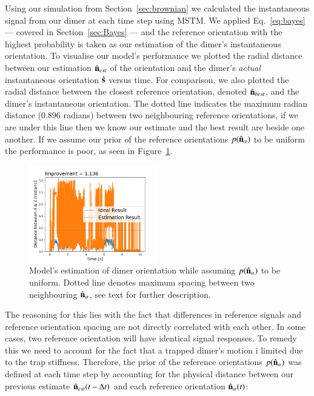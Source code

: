 \documentclass[final, 3p]{elsarticle}
\begin{document}
Using our simulation from Section~\ref{sec:brownian} we calculated the instantaneous signal from our dimer at each time step using MSTM.  We applied Eq.~\eqref{eq:bayes} --- covered in Section~\ref{sec:Bayes} --- and the reference orientation with the highest probability is taken as our estimation of the dimer's instantaneous orientation. To visualise our model's performance  we plotted the radial distance between our estimation $\hat{\bf n}_{est}$ of the orientation and the dimer's \emph{actual} instantaneous orientation $\hat{\bf s}$ versus time. For comparison, we also plotted the radial distance between the closest reference orientation, denoted $\hat{\bf n}_{best}$, and the dimer's instantaneous orientation. The dotted line indicates the maximum radian distance ($0.896$ radians) between two neighbouring reference orientations, if we are under this line then we know our estimate and the best result are beside one another. If we assume our prior of the reference orientations $p(\hat{\bf n}_\alpha)$ to be uniform the performance is poor, as seen in Figure~\ref{fig:uniform}.

\begin{figure}[h]
	\centering
	\includegraphics[width=0.5\textwidth]{./Images/fig3.png}
	\caption{Model's estimation of dimer orientation while assuming $p(\hat{\bf n}_\alpha)$ to be uniform. Dotted line denotes maximum spacing between two neighbouring $\hat{\bf n}_\alpha$, see text for further description.}
	\label{fig:uniform}
\end{figure} 

The reasoning for this lies with the fact that differences in reference signals and reference orientation spacing are not directly correlated with each other. In some cases, two reference orientation will have identical signal responses. To remedy this we need to account for the fact that a trapped dimer's motion i limited due to the trap stiffness. Therefore, the prior of the reference orientations $p(\hat{\bf n}_\alpha)$ was defined at each time step by accounting for the physical distance between our previous estimate $\hat{\bf n}_{est}(t - \Delta t)$ and each reference orientation $\hat{\bf n}_\alpha(t)$:
\end{document}
